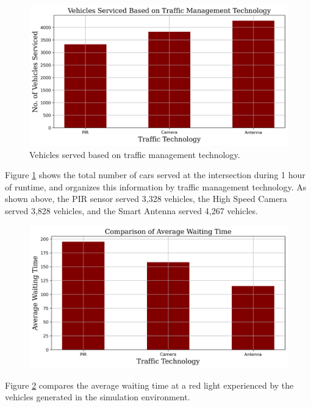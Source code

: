 \documentclass[12pt, a4paper,titlepage]{article}
\begin{document}
\begin{figure}[H]
	\centering
	\includegraphics[width=\linewidth]{images/VehiclesServed_vs_Traffictechnology}
	\caption{Vehicles served based on traffic management technology.}
	\label{fig:vehiclesservedvstraffictechnology}
\end{figure}

Figure \ref{fig:vehiclesservedvstraffictechnology} shows the total number of cars served at the intersection during 1 hour of runtime, and organizes this information by traffic management technology. As shown above, the PIR sensor served 3,328 vehicles, the High Speed Camera served 3,828 vehicles, and the Smart Antenna served 4,267 vehicles.

\begin{figure}[H]
	\centering
	\includegraphics[width=\linewidth]{images/AWT_vs_TrafficTechnology}
	\caption{}
	\label{fig:awtvstraffictechnology}
\end{figure}

Figure \ref{fig:awtvstraffictechnology} compares the average waiting time at a red light experienced by the vehicles generated in the simulation environment. 
\end{document}
